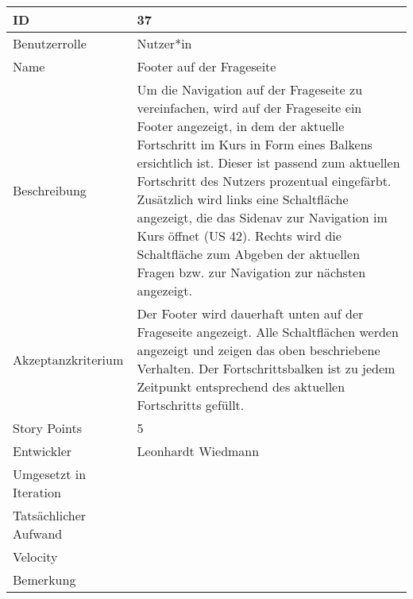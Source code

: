\begin{tabularx}{\textwidth}{|p{}|X|}
	\hline
	ID & 37\\
	\hline
	Benutzerrolle & Nutzer*in\\
	\hline
	Name & Footer auf der Frageseite\\
	\hline
	Beschreibung & Um die Navigation auf der Frageseite zu vereinfachen, wird auf der Frageseite ein Footer angezeigt, in dem der aktuelle Fortschritt im Kurs in Form eines Balkens ersichtlich ist. Dieser ist passend zum aktuellen Fortschritt des Nutzers prozentual eingefärbt. Zusätzlich wird links eine Schaltfläche angezeigt, die das Sidenav zur Navigation im Kurs öffnet (US 42). Rechts wird die Schaltfläche zum Abgeben der aktuellen Fragen bzw. zur Navigation zur nächsten angezeigt.\\
	\hline
	Akzeptanzkriterium & Der Footer wird dauerhaft unten auf der Frageseite angezeigt. Alle Schaltflächen werden angezeigt und zeigen das oben beschriebene Verhalten. Der Fortschrittsbalken ist zu jedem Zeitpunkt entsprechend des aktuellen Fortschritts gefüllt.\\
	\hline
	Story Points & 5\\
	\hline
	Entwickler & Leonhardt Wiedmann\\
	\hline
	Umgesetzt in Iteration & \\ 
	\hline
	Tatsächlicher Aufwand & \\
	\hline
	Velocity & \\
	\hline
	Bemerkung & \\
	\hline
\end{tabularx}
\vspace{20pt}
